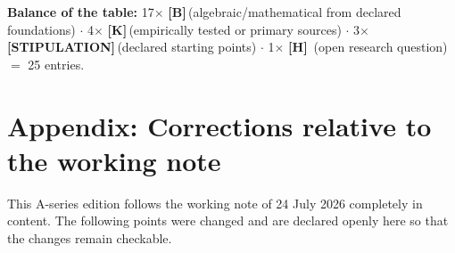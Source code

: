 \documentclass[11pt,a4paper]{article}
\newcommand{\LS}{\textcolor{laySet}{\textbf{\footnotesize\textsf{[STIPULATION]}}}\,}
\newcommand{\LK}{\textcolor{layK}{\textbf{\footnotesize\textsf{[K]}}}\,}
\newcommand{\LB}{\textcolor{layB}{\textbf{\footnotesize\textsf{[B]}}}\,}
\newcommand{\LH}{\textcolor{layH}{\textbf{\footnotesize\textsf{[H]}}}\,}
\begin{document}
\textbf{Balance of the table:} 17$\times$ \LB (algebraic/mathematical from
declared foundations) $\cdot$ 4$\times$ \LK (empirically tested or primary
sources) $\cdot$ 3$\times$ \LS (declared starting points) $\cdot$ 1$\times$ \LH
(open research question) $=$ 25 entries.

\clearpage
{}
{}
\section*{Appendix: Corrections relative to the working note}
\label{sec:corr}

This A-series edition follows the working note of 24 July 2026 completely in
content. The following points were changed and are declared openly here so that
the changes remain checkable.
\end{document}
